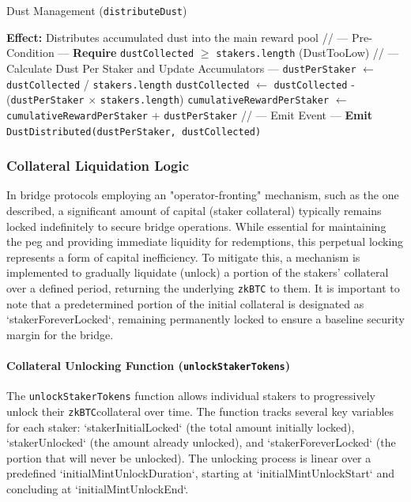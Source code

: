 \documentclass{DESSThesis}
\newcommand{\zktoken}{\texttt{zkBTC}}
\begin{document}
\begin{algorithm}[htbp]
\caption{Dust Management (\texttt{distributeDust})}
\label{alg:distribute_dust}
\begin{algorithmic}[1]
        \State \textbf{Effect:} Distributes accumulated dust into the main reward pool
        \State
        \State // --- Pre-Condition ---
        \State \textbf{Require} \texttt{dustCollected} $\ge$ \texttt{stakers.length} (DustTooLow)
        \State
        \State // --- Calculate Dust Per Staker and Update Accumulators ---
        \State \texttt{dustPerStaker} $\gets$ \texttt{dustCollected} / \texttt{stakers.length}
        \State \texttt{dustCollected} $\gets$ \texttt{dustCollected} - (\texttt{dustPerStaker} $\times$ \texttt{stakers.length})
        \State \texttt{cumulativeRewardPerStaker} $\gets$ \texttt{cumulativeRewardPerStaker} + \texttt{dustPerStaker}
        \State
        \State // --- Emit Event ---
        \State \textbf{Emit} \texttt{DustDistributed(dustPerStaker, dustCollected)}
    \EndProcedure
\end{algorithmic}
\end{algorithm}

\subsubsection{Collateral Liquidation Logic}
In bridge protocols employing an "operator-fronting" mechanism, such as the one described, a significant amount of capital (staker collateral) typically remains locked indefinitely to secure bridge operations. While essential for maintaining the peg and providing immediate liquidity for redemptions, this perpetual locking represents a form of capital inefficiency. To mitigate this, a mechanism is implemented to gradually liquidate (unlock) a portion of the stakers' collateral over a defined period, returning the underlying \texttt{\zktoken} to them. It is important to note that a predetermined portion of the initial collateral is designated as `stakerForeverLocked`, remaining permanently locked to ensure a baseline security margin for the bridge.

\paragraph{Collateral Unlocking Function (\texttt{unlockStakerTokens})}
The \texttt{unlockStakerTokens} function allows individual stakers to progressively unlock their \zktoken collateral over time. The function tracks several key variables for each staker: `stakerInitialLocked` (the total amount initially locked), `stakerUnlocked` (the amount already unlocked), and `stakerForeverLocked` (the portion that will never be unlocked). The unlocking process is linear over a predefined `initialMintUnlockDuration`, starting at `initialMintUnlockStart` and concluding at `initialMintUnlockEnd`.
\end{document}
